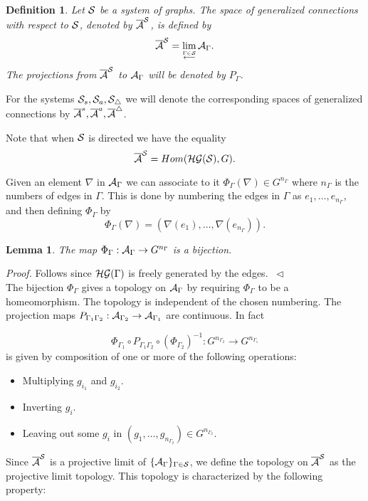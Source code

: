 \documentclass[12pt]{article}
\newcommand{\eproof}{{~\hfill$ \triangleleft$}}
\def\G{\Gamma}
\def\ca{{\cal A}}
\def\cg{{\cal G}}
\def\ch{{\cal H}}
\def\cs{{\cal S}}
\newtheorem{lemma}[thm]{Lemma}
\newtheorem{definition}[thm]{Definition}
\begin{document}
{\begin{definition}
Let $\cs$ be a system of graphs. The space of generalized connections with respect to $\cs$, denoted by $\overline{\ca}^\cs$, is defined by
$$\overline{\ca}^\cs= \lim_{\stackrel{\Gamma \in \cs}{\longleftarrow} }\ca_\Gamma.$$ 
The projections from $\overline{\ca}^\cs$ to $\ca_\Gamma$ will be denoted by $P_\Gamma$.

\end{definition}
For the systems $\cs_s, \cs_a, \cs_\triangle$ we will denote the corresponding spaces of generalized connections by $\overline{\ca}^s,\overline{\ca}^a,\overline{\ca}^\triangle$.

Note that when $\cs$ is directed we have the equality $$\overline{\ca}^\cs=Hom(\ch\cg (\cs),G).$$

Given an element $\nabla$ in $\ca_\Gamma$ we can associate to it $\Phi_\Gamma (\nabla )\in G^{ n_\Gamma}$ where $n_\Gamma$ is the numbers of edges in $\Gamma$. This is done by numbering the edges in $\Gamma$ as $e_1,\ldots , e_{n_\G}$, and then defining $\Phi_\Gamma$ by
$$\Phi_\Gamma (\nabla )=(\nabla (e_1),\ldots , \nabla (e_{n_\Gamma})).$$


\begin{lemma} \label{gn}
The map $\Phi_\Gamma : \ca_\Gamma \to G^{n_\Gamma}$ is a bijection.
\end{lemma}

\textit{Proof.} Follows since $\ch \cg (\Gamma)$ is freely generated by the edges. \eproof\\

The bijection $\Phi_\Gamma$ gives a topology on $\ca_\Gamma$ by requiring $\Phi_\Gamma$ to be a homeomorphism. The topology is independent of the chosen numbering.  The projection maps $P_{\Gamma_1 \Gamma_2}:\ca_{\Gamma_2}\to \ca_{\Gamma_1}$ are continuous. In fact 

$$\Phi_{\Gamma_1}\circ P_{\Gamma_1 \Gamma_2} \circ (\Phi_{\Gamma_2})^{-1} : G^{n_{\Gamma_2}}\to G^{n_{\Gamma_1}}$$
is given by composition of one or more of the following operations:
\begin{itemize}
\item Multiplying $g_{i_1}$ and $g_{i_2}$.
\item Inverting $g_i$.
\item Leaving out some $g_i$ in $(g_1,\ldots , g_{n_{\Gamma_2}})\in G^{n_{\Gamma_2}}$.
\end{itemize}
 
Since $\overline{\ca}^\cs$ is a projective limit of $\{ \ca_\Gamma\}_{\Gamma \in \cs}$, we define the topology on $\overline{\ca}^\cs$ as the projective limit topology. This topology is characterized by the following property:

}
\end{document}

